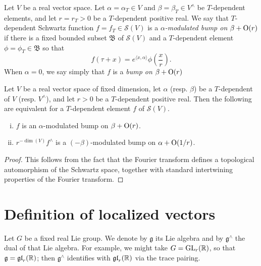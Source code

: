 \documentclass[reqno]{amsart} 
\numberwithin{equation}{section}
\numberwithin{theorem}{section}
\begin{document}
\begin{definition}\label{definition:d1a910775837}
  Let $V$ be a real vector space.  Let $\alpha = \alpha_T \in V$ and $\beta = \beta_T \in V^\wedge$ be $T$-dependent elements, and let $r = r_T > 0$ be a $T$-dependent positive real.  We say that $T$-dependent Schwartz function $f = f_T \in \mathcal{S}(V)$ is a $\alpha$\emph{-modulated bump on} $\beta + \operatorname{O}(r)$ if there is a fixed bounded subset $\mathfrak{B}$ of $\mathcal{S}(V)$ and a $T$-dependent element $\phi = \phi_T \in \mathfrak{B}$ so that
  \begin{equation*}
f(\tau + x) =  e^{\langle x, \alpha \rangle} \phi\left( \frac{x }{r} \right).
\end{equation*}
When $\alpha = 0$, we say simply that $f$ is a \emph{bump on } $\beta + \operatorname{O}(r)$ 
\end{definition}

\begin{lemma}
  Let $V$ be a real vector space of fixed dimension, let $\alpha$ (resp. $\beta$) be a $T$-dependent of $V$ (resp. $V^\wedge$), and let $r > 0$ be a $T$-dependent positive real.  Then the following are equivalent for a $T$-dependent element $f$ of $\mathcal{S}(V)$.
\begin{enumerate}[(i)]
\item $f$ is an  $\alpha$-modulated bump on $\beta + \operatorname{O}(r)$.  
\item $r^{-\dim(V)} f^\wedge$ is a $(-\beta)$-modulated bump on $\alpha + \operatorname{O}(1/r)$.
\end{enumerate}  
\end{lemma}
\begin{proof}
This follows from the fact that the Fourier transform defines a topological automorphism of the Schwartz space, together with standard intertwining properties of the Fourier transform.
\end{proof}



\section{Definition of localized vectors}\label{sec:d1a8de614cc9}
Let $G$ be a fixed real Lie group.  We denote by $\mathfrak{g}$ its Lie algebra and by $\mathfrak{g}^\wedge$ the dual of that Lie algebra.  For example, we might take $G = \operatorname{GL}_r(\mathbb{R})$, so that $\mathfrak{g} = \operatorname{\mathfrak{g}\mathfrak{l}}_r(\mathbb{R})$; then $\mathfrak{g}^\wedge$ identifies with $\operatorname{\mathfrak{g}\mathfrak{l}}_r(\mathbb{R})$ via the trace pairing.
\end{document}
